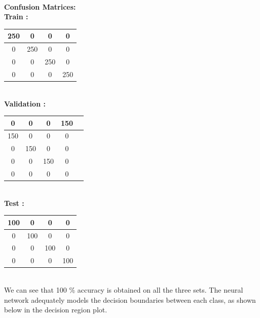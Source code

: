 \documentclass{article}
\begin{document}
\begin{flushleft}
\textbf{\\[5pt]Confusion Matrices: \\[10pt]}
\textbf{Train :\\[5pt]}

\begin{tabular}{|c|c|c|c|} \hline 250 & 0 & 0 & 0\\ \hline 0 & 250 & 0 & 0\\ \hline 0 & 0 & 250 & 0\\ \hline 0 & 0 & 0 & 250 \\ \hline \end{tabular}


\textbf{\\[10pt]Validation :\\[5pt]}

\begin{tabular}{|c|c|c|c|c|} \hline  0 & 0 & 0 & 150\\ \hline 150 & 0 & 0 & 0\\ \hline 0 & 150 & 0 & 0\\ \hline  0 & 0 & 150 & 0\\ \hline 0 & 0 & 0 & 0 \\ \hline \end{tabular}

\textbf{\\[10pt]Test :\\[5pt]}


\begin{tabular}{|c|c|c|c|} \hline 100 & 0 & 0 & 0\\ \hline 0 & 100 & 0 & 0\\ \hline 0 & 0 & 100 & 0\\ \hline 0 & 0 & 0 & 100 \\ \hline \end{tabular} \\[10pt]


We can see that 100 \% accuracy is obtained on all the three sets. The neural network adequately models the decision boundaries between each class, as shown below in the decision region plot.

\newpage


\end{flushleft}
\end{document}
